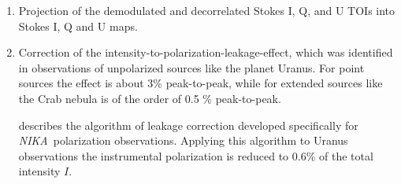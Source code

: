\documentclass[twocolumn,traditabstract]{aa}
\def\NIKA{\textit{NIKA}}
\begin{document}
\begin{enumerate}
\item Projection of the demodulated and decorrelated Stokes I, Q, and U TOIs into Stokes I, Q and U maps.

\item Correction of the intensity-to-polarization-leakage-effect, which was
  identified in observations of unpolarized sources like the planet Uranus. For
  point sources the effect is about 3\% peak-to-peak, while for extended sources like the Crab nebula is of the order of 0.5 \% peak-to-peak. 
  
  \cite{ritacco2017} describes the algorithm of leakage correction developed specifically for \NIKA\ polarization observations. Applying this algorithm to Uranus observations the instrumental polarization is reduced to 0.6\% of the total intensity $I$.



\end{enumerate}
\end{document}

